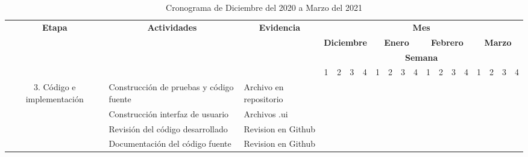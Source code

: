 \begin{table}[H]
    \centering
    \caption{Cronograma de Diciembre del 2020 a Marzo del 2021}
    \begin{adjustbox}{width={\textwidth},totalheight={\textheight},keepaspectratio}%
    \begin{tabular}{cp{10.555em}p{6.555em}rrrrrrrrrrrrrrrr}
    \hline
    \multirow{4}[8]{*}{\textbf{Etapa}} & \multicolumn{1}{c}{\multirow{4}[8]{*}{\textbf{Actividades}}} & \multicolumn{1}{c}{\multirow{4}[8]{*}{\textbf{Evidencia}}} & \multicolumn{16}{c}{\textbf{Mes}} \bigstrut\\
    \cline{4-19}  & \multicolumn{1}{c}{} & \multicolumn{1}{c}{} & \multicolumn{4}{c}{\textbf{Diciembre}} & \multicolumn{4}{c}{\textbf{Enero}} & \multicolumn{4}{c}{\textbf{Febrero}} & \multicolumn{4}{c}{\textbf{Marzo}} \bigstrut\\
    \cline{4-19}  & \multicolumn{1}{c}{} & \multicolumn{1}{c}{} & \multicolumn{16}{c}{\textbf{Semana}} \bigstrut\\
    \cline{4-19}  & \multicolumn{1}{c}{} & \multicolumn{1}{c}{} & \multicolumn{1}{c}{1} & \multicolumn{1}{c}{2} & \multicolumn{1}{c}{3} & \multicolumn{1}{c}{4} & \multicolumn{1}{c}{1} & \multicolumn{1}{c}{2} & \multicolumn{1}{c}{3} & \multicolumn{1}{c}{4} & \multicolumn{1}{c}{1} & \multicolumn{1}{c}{2} & \multicolumn{1}{c}{3} & \multicolumn{1}{c}{4} & \multicolumn{1}{c}{1} & \multicolumn{1}{c}{2} & \multicolumn{1}{c}{3} & \multicolumn{1}{c}{4} \bigstrut\\
    \cline{1-3}\multicolumn{1}{c}{\multirow{5}[10]{*}{3. Código e implementación}} & Construcción de pruebas y código fuente & Archivo en repositorio & \cellcolor[rgb]{ .663,  .816,  .557} & \cellcolor[rgb]{ .663,  .816,  .557} & \cellcolor[rgb]{ .663,  .816,  .557} & \cellcolor[rgb]{ .663,  .816,  .557} &   &   &   &   &   &   &   &   &   &   &   &  \bigstrut\\
    \cline{2-3}  & Construcción interfaz de usuario & Archivos .ui & \cellcolor[rgb]{ .886,  .937,  .855} &   &   &   &   &   &   &   &   &   &   &   &   &   &   &  \bigstrut\\
    \cline{2-3}  & Revisión del código desarrollado & Revision en Github & \cellcolor[rgb]{ .663,  .816,  .557} & \cellcolor[rgb]{ .663,  .816,  .557} & \cellcolor[rgb]{ .663,  .816,  .557} & \cellcolor[rgb]{ .663,  .816,  .557} &   &   &   &   &   &   &   &   &   &   &   &  \bigstrut\\
    \cline{2-3}  & Documentación del código fuente & Revision en Github &   &   &   & \cellcolor[rgb]{ .886,  .937,  .855} & \cellcolor[rgb]{ .886,  .937,  .855} & \cellcolor[rgb]{ .886,  .937,  .855} &   &   &   &   &   &   &   &   &   &  \bigstrut\\

\end{tabular}
\end{adjustbox}
\end{table}
